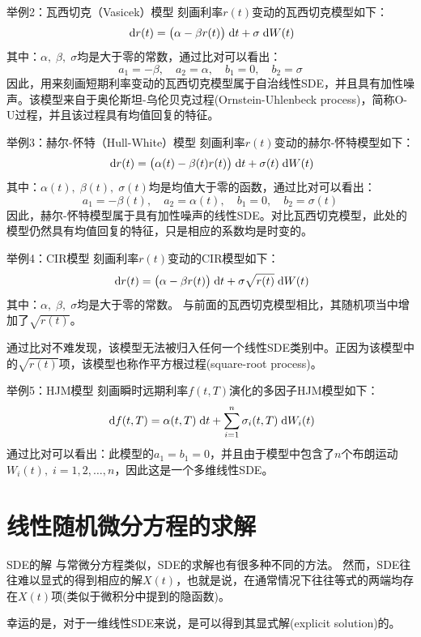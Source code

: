 \documentclass[t]{beamer}
\newcommand{\dif}{{\;\rm d}}
\begin{document}
\begin{frame}{举例2：瓦西切克（Vasicek）模型}
刻画利率$r(t)$变动的瓦西切克模型如下：
\[\dif r(t)=\big(\alpha-\beta r(t)\big)\dif t+\sigma \dif W(t) \]
其中：$\alpha,\;\beta,\;\sigma$均是大于零的常数，通过比对可以看出：
\[a_1=-\beta,\quad a_2=\alpha,\quad b_1=0,\quad b_2=\sigma \]
因此，用来刻画短期利率变动的瓦西切克模型属于自治线性SDE，并且具有加性噪声。该模型来自于奥伦斯坦-乌伦贝克过程(Ornstein-Uhlenbeck process)，简称O-U过程，并且该过程具有均值回复的特征。

\end{frame}


\begin{frame}{举例3：赫尔-怀特（Hull-White）模型}
刻画利率$r(t)$变动的赫尔-怀特模型如下：
\[\dif r(t)=\big(\alpha(t)-\beta(t) r(t)\big)\dif t+\sigma(t) \dif W(t)  \]
其中：$\alpha(t),\;\beta(t),\;\sigma(t)$均是均值大于零的函数，通过比对可以看出：
\[a_1=-\beta(t),\quad a_2=\alpha(t),\quad b_1=0,\quad b_2=\sigma(t) \]
因此，赫尔-怀特模型属于具有加性噪声的线性SDE。对比瓦西切克模型，此处的模型仍然具有均值回复的特征，只是相应的系数均是时变的。
\end{frame}

\begin{frame}{举例4：CIR模型}
刻画利率$r(t)$变动的CIR模型如下：
\[\dif r(t)=\big(\alpha-\beta r(t)\big)\dif t+\sigma\sqrt{r(t)} \dif W(t)  \]
其中：$\alpha,\;\beta,\;\sigma$均是大于零的常数。
与前面的瓦西切克模型相比，其随机项当中增加了$\sqrt{r(t)}$。

通过比对不难发现，该模型无法被归入任何一个线性SDE类别中。正因为该模型中的$\sqrt{r(t)}$项，该模型也称作平方根过程(square-root process)。
\end{frame}

\begin{frame}{举例5：HJM模型}
刻画瞬时远期利率$f(t,T)$演化的多因子HJM模型如下：
\[\dif f(t,T)=\alpha(t,T)\dif t+\sum^n_{i=1}\sigma_i(t,T)\dif W_i(t) \]
通过比对可以看出：此模型的$a_1=b_1=0$，并且由于模型中包含了$n$个布朗运动$W_i(t),\; i=1,2,\ldots,n$，因此这是一个多维线性SDE。
\end{frame}

\section{线性随机微分方程的求解}
\begin{frame}{SDE的解}
与常微分方程类似，SDE的求解也有很多种不同的方法。
然而，SDE往往难以显式的得到相应的解$X(t)$，也就是说，在通常情况下往往等式的两端均存在$X(t)$项(类似于微积分中提到的隐函数)。

幸运的是，对于一维线性SDE来说，是可以得到其显式解(explicit solution)的。
\end{frame}
\end{document}
